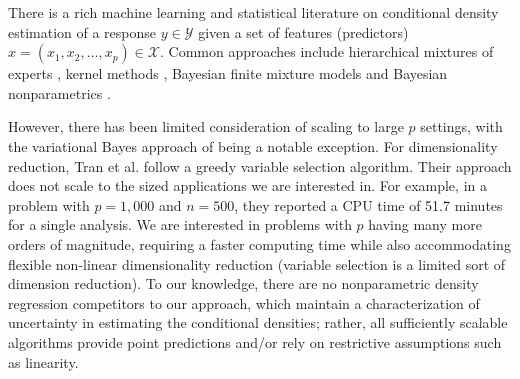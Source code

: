 \documentclass{article} %
\begin{document}
There is a rich machine learning and statistical literature on conditional density estimation of a response $y \in \mathcal{Y}$ given a set of features (predictors) $x=(x_1, x_2, \ldots, x_p)\in \mathcal{X}$. Common approaches include hierarchical mixtures of experts \cite{mixtureexperts,jiang1999}, kernel methods \cite{fan1996,fanyim2004,holmes2010,fu2011}, Bayesian finite mixture models \cite{nott2012,tran2012,norets2012} and Bayesian nonparametrics 
\cite{griffin06, dunson2007, DunsonPark, chung2009, tokdar2010}.  

However, there has been limited consideration of scaling to large $p$ settings, with the variational Bayes approach of \cite{tran2012} being a notable exception. For dimensionality reduction, Tran et al. follow a greedy variable selection algorithm.  Their approach does not scale to the sized applications we are interested in. For example, in a problem with $p=1,000$ and $n=500$, they reported a CPU time of 51.7 minutes for a single analysis.  We are interested in problems with  $p$ having many more orders of magnitude, requiring a faster computing time while also accommodating flexible non-linear dimensionality reduction (variable selection is a limited sort of dimension reduction).  To our knowledge, there are no nonparametric density regression competitors to our approach, which maintain a characterization of uncertainty in estimating the conditional densities; rather, all sufficiently scalable algorithms provide point predictions and/or rely on restrictive assumptions such as linearity.  
\end{document}
